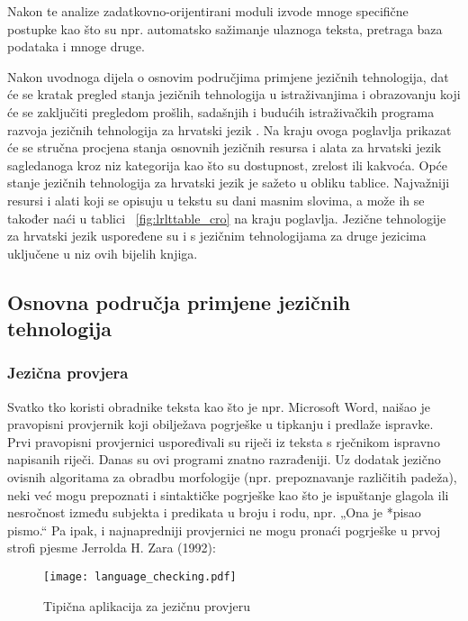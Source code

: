 \begin{multicols}{2}
Nakon te analize zadatkovno-orijentirani moduli izvode mnoge specifične postupke kao što su npr. automatsko sažimanje ulaznoga teksta, pretraga baza podataka i mnoge druge.

Nakon uvodnoga dijela o osnovim područjima primjene jezičnih tehnologija, dat će se kratak pregled stanja jezičnih tehnologija u istraživanjima i obrazovanju koji će se zaključiti pregledom prošlih, sadašnjih i budućih istraživačkih programa razvoja jezičnih tehnologija za hrvatski jezik \cite{boo5}. Na kraju ovoga poglavlja prikazat će se stručna procjena stanja osnovnih jezičnih resursa i alata za hrvatski jezik sagledanoga kroz niz kategorija kao što su dostupnost, zrelost ili kakvoća. Opće stanje jezičnih tehnologija za hrvatski jezik je sažeto u obliku tablice. Najvažniji resursi i alati koji se opisuju u tekstu su dani masnim slovima, a može ih se također naći u tablici ~\ref{fig:lrlttable_cro} na kraju poglavlja. Jezične tehnologije za hrvatski jezik uspoređene su i s jezičnim tehnologijama za druge jezicima uključene u niz ovih bijelih knjiga.

\subsection{Osnovna područja primjene jezičnih tehnologija} 

\subsubsection{Jezična provjera}

Svatko tko koristi obradnike teksta kao što je npr. Microsoft Word, naišao je pravopisni provjernik koji obilježava pogrješke u tipkanju i predlaže ispravke. Prvi pravopisni provjernici uspoređivali su riječi iz teksta s rječnikom ispravno napisanih riječi. Danas su ovi programi znatno razrađeniji. Uz dodatak jezično ovisnih algoritama za obradbu morfologije (npr. prepoznavanje različitih padeža), neki već mogu prepoznati i sintaktičke pogrješke kao što je ispuštanje glagola ili nesročnost između subjekta i predikata u broju i rodu, npr. „Ona je *pisao pismo.“ Pa ipak, i najnapredniji provjernici ne mogu pronaći pogrješke u prvoj strofi pjesme Jerrolda H. Zara (1992):

\begin{figure*}[t]
  \center
  \texttt{[image: language\_checking.pdf]}
  \caption{Tipična aplikacija za jezičnu provjeru}
  \label{fig:langcheckingaarch_cro}
\end{figure*}


\end{multicols}
